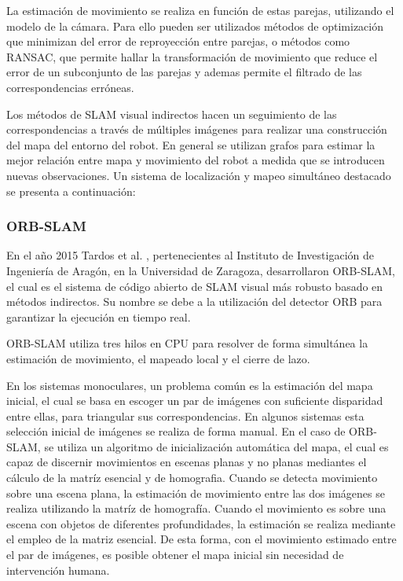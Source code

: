 La estimación de movimiento se realiza en función de estas parejas, utilizando el modelo de la cámara. Para ello pueden ser utilizados métodos de optimización que minimizan del error de reproyección entre parejas, o métodos como RANSAC, que permite hallar la transformación de movimiento que reduce el error de un subconjunto de las parejas y ademas permite el filtrado de las correspondencias erróneas.

Los métodos de SLAM visual indirectos hacen un seguimiento de las correspondencias a través de múltiples imágenes para realizar una construcción del mapa del entorno del robot. En general se utilizan grafos para estimar la mejor relación entre mapa y movimiento del robot a medida que se introducen nuevas observaciones. Un sistema de localización y mapeo simultáneo destacado se presenta a continuación:


\subsubsection{ORB-SLAM}

En el año 2015 Tardos et al. \cite{orbSlam}, pertenecientes al Instituto de Investigación de Ingeniería de Aragón, en la Universidad de Zaragoza,  desarrollaron ORB-SLAM, el cual es el sistema de código abierto de SLAM visual más robusto basado en métodos indirectos. Su nombre se debe a la utilización del detector ORB para garantizar la ejecución en tiempo real.

ORB-SLAM utiliza tres hilos en CPU para resolver de forma simultánea la estimación de movimiento, el mapeado local y el cierre de lazo.

En los sistemas monoculares, un problema común es la estimación del mapa inicial, el cual se basa en escoger un par de imágenes con suficiente disparidad entre ellas, para triangular sus correspondencias. En algunos sistemas esta selección inicial de imágenes se realiza de forma manual. En el caso de ORB-SLAM, se utiliza un algoritmo de inicialización automática del mapa, el cual es capaz de discernir movimientos en escenas planas y no planas mediantes el cálculo de la matríz esencial y de homografia. Cuando se detecta movimiento sobre una escena plana, la estimación de movimiento entre las dos imágenes se realiza utilizando la matríz de homografía. Cuando el movimiento es sobre una escena con objetos de diferentes profundidades, la estimación se realiza mediante el empleo de la matriz esencial.  De esta forma, con el movimiento estimado entre el par de imágenes, es posible obtener el mapa inicial sin necesidad de intervención humana.


